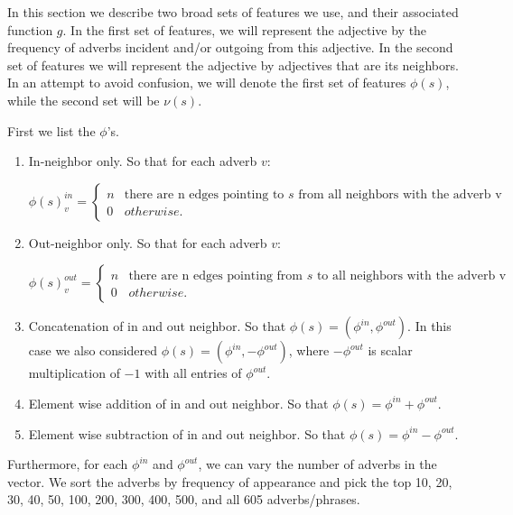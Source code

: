 In this section we describe two broad sets of features we use, and their associated function $g$. In the first set of features, we will represent the adjective by the frequency of adverbs incident and/or outgoing from this adjective. In the second set of features we will represent the adjective by adjectives that are its neighbors. In an attempt to avoid confusion, we will denote the first set of features $\phi(s)$, while the second set will be $\nu(s)$.

First we list the $\phi$'s.

\begin{enumerate}
	\item In-neighbor only. So that for each adverb $v$:

		\[   
		\phi(s)^{in}_v = \left\{
		\begin{array}{ll}
		      n & \text{there are n edges pointing to $s$ from all neighbors with the adverb v} \\
		      0 & otherwise.
		\end{array} 
		\right.
		\]

	\item Out-neighbor only. So that for each adverb $v$:

		\[   
		\phi(s)^{out}_v = \left\{
		\begin{array}{ll}
		      n & \text{there are n edges pointing from $s$ to all neighbors with the adverb v} \\
		      0 & otherwise.
		\end{array} 
		\right. 
		\]

	\item Concatenation of in and out neighbor. So that $\phi(s) = (\phi^{in}, \phi^{out})$. In this case we also considered $\phi(s) = (\phi^{in}, - \phi^{out})$, where $- \phi^{out}$ is scalar multiplication of $-1$ with all entries of $\phi^{out}$.

	\item Element wise addition of in and out neighbor. So that $\phi(s) = \phi^{in} + \phi^{out}$.
	
	\item Element wise subtraction of in and out neighbor. So that $\phi(s) = \phi^{in} - \phi^{out}$.

\end{enumerate}

Furthermore, for each $\phi^{in}$ and $\phi^{out}$, we can vary the number of adverbs in the vector. We sort the adverbs by frequency of appearance and pick the top 10, 20, 30, 40, 50, 100, 200, 300, 400, 500, and all 605 adverbs/phrases. 

